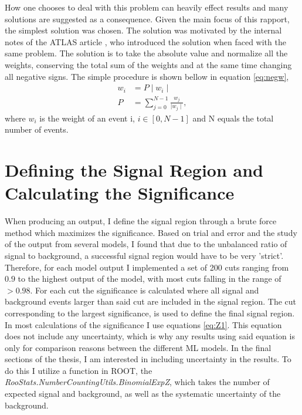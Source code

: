 How one chooses to deal with this problem can heavily effect results and many solutions 
are suggested as a consequence. Given the main focus of this rapport, the 
simplest solution was chosen. The solution was motivated by the internal notes of 
the \ac{ATLAS} article \cite{Aad:2800889}, who introduced the solution when faced with the same 
problem. The solution is to take the absolute value and normalize all the weights, conserving 
the total sum of the weights and at the same time changing all negative signs. The simple procedure 
is shown bellow in equation \ref{eq:negw},
\begin{align}\label{eq:negw}
    w_i & = P \mid w_i \mid\,  \\
    P  & =  \sum_{j=0}^{N-1}\frac{ w_j}{\mid w_j \mid},
\end{align}
where $w_i$ is the weight of an event i, $i \in [0,N-1]$ and N equals the total number of events.
\section{Defining the Signal Region and Calculating the Significance}
When producing an output, I define the signal region through a brute force method which maximizes the significance. 
Based on trial and error and the study of the output from several models, I found that due to the unbalanced ratio of 
signal to background, a successful signal region would have to be very 'strict'. Therefore, for each model output I implemented a 
set of 200 cuts ranging from $0.9$ to the highest output of the model, with most cuts falling in the range of $>0.98$. For each cut
the significance is calculated where all signal and background events larger than said cut are included in the signal region. The cut 
corresponding to the largest significance, is used to define the final signal region.  
\\
In most calculations of the significance I use equations \ref{eq:Z1}. This equation does not include any 
uncertainty, which is why any results using said equation is only for comparison reasons between the different \ac{ML}
models. In the final sections of the thesis, I am interested in including uncertainty in the results. To do this I utilize 
a function in ROOT, the \emph{RooStats.NumberCountingUtils.BinomialExpZ}, which takes the number of expected signal and background, 
as well as the systematic uncertainty of the background.